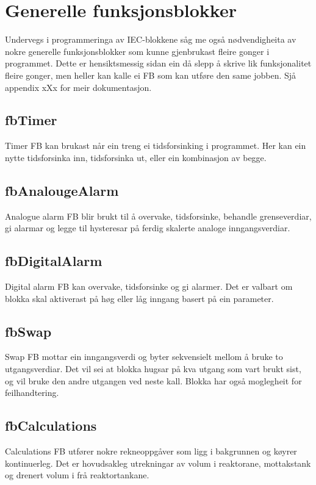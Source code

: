 \section{Generelle funksjonsblokker}
\thispagestyle{fancy}


Undervegs i programmeringa av \gls{IEC}-blokkene såg me også nødvendigheita av nokre generelle funksjonsblokker
som kunne gjenbrukast fleire gonger i programmet. Dette er hensiktsmessig sidan ein då slepp å skrive lik 
funksjonalitet fleire gonger, men heller kan kalle ei \gls{FB} som kan utføre den same jobben. \newline
Sjå appendix xXx for meir dokumentasjon.

\subsection{fbTimer}
Timer \gls{FB} kan brukast når ein treng ei tidsforsinking i programmet.
Her kan ein nytte tidsforsinka inn, tidsforsinka ut, eller ein kombinasjon av begge.

\subsection{fbAnalougeAlarm}
Analogue alarm \gls{FB} blir brukt til å overvake, tidsforsinke, behandle grenseverdiar, 
gi alarmar og legge til hysteresar på ferdig skalerte analoge inngangsverdiar.

\subsection{fbDigitalAlarm}
Digital alarm \gls{FB} kan overvake, tidsforsinke og gi alarmer. Det er valbart om blokka skal aktiverast på høg eller låg
inngang basert på ein parameter.

\subsection{fbSwap}
Swap \gls{FB} mottar ein inngangsverdi og byter sekvensielt mellom å bruke to utgangsverdiar. Det vil sei at blokka hugsar på kva utgang som vart brukt sist,
og vil bruke den andre utgangen ved neste kall. Blokka har også moglegheit for feilhandtering.

\subsection{fbCalculations}
Calculations \gls{FB} utfører nokre rekneoppgåver som ligg i bakgrunnen og køyrer kontinuerleg. 
Det er hovudsakleg utrekningar av volum i reaktorane, mottakstank og drenert volum i frå reaktortankane.

